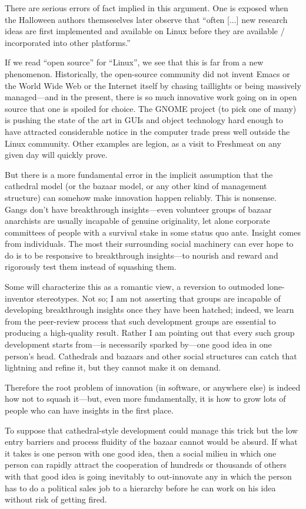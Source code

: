 \documentclass[a4paper,12pt,UTF8,twoside]{ctexbook}
\begin{document}
There are serious errors of fact implied in this argument. One is exposed when the Halloween authors themseselves later observe that ``often [...] new research ideas are first implemented and available on Linux before they are available / incorporated into other platforms.''

If we read ``open source'' for ``Linux'', we see that this is far from a new phenomenon. Historically, the open-source community did not invent Emacs or the World Wide Web or the Internet itself by chasing taillights or being massively managed—and in the present, there is so much innovative work going on in open source that one is spoiled for choice. The GNOME project (to pick one of many) is pushing the state of the art in GUIs and object technology hard enough to have attracted considerable notice in the computer trade press well outside the Linux community. Other examples are legion, as a visit to Freshmeat on any given day will quickly prove.

But there is a more fundamental error in the implicit assumption that the cathedral model (or the bazaar model, or any other kind of management structure) can somehow make innovation happen reliably. This is nonsense. Gangs don't have breakthrough insights—even volunteer groups of bazaar anarchists are usually incapable of genuine originality, let alone corporate committees of people with a survival stake in some status quo ante. Insight comes from individuals. The most their surrounding social machinery can ever hope to do is to be responsive to breakthrough insights—to nourish and reward and rigorously test them instead of squashing them.

Some will characterize this as a romantic view, a reversion to outmoded lone-inventor stereotypes. Not so; I am not asserting that groups are incapable of developing breakthrough insights once they have been hatched; indeed, we learn from the peer-review process that such development groups are essential to producing a high-quality result. Rather I am pointing out that every such group development starts from—is necessarily sparked by—one good idea in one person's head. Cathedrals and bazaars and other social structures can catch that lightning and refine it, but they cannot make it on demand.

Therefore the root problem of innovation (in software, or anywhere else) is indeed how not to squash it—but, even more fundamentally, it is how to grow lots of people who can have insights in the first place.

To suppose that cathedral-style development could manage this trick but the low entry barriers and process fluidity of the bazaar cannot would be absurd. If what it takes is one person with one good idea, then a social milieu in which one person can rapidly attract the cooperation of hundreds or thousands of others with that good idea is going inevitably to out-innovate any in which the person has to do a political sales job to a hierarchy before he can work on his idea without risk of getting fired.
\end{document}
